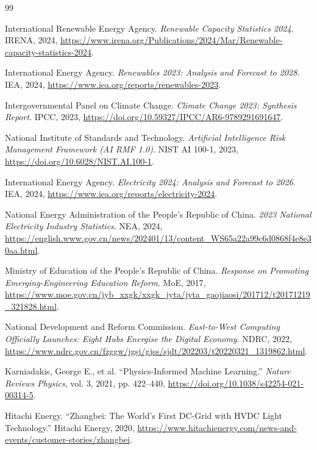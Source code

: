 \documentclass[12pt]{article}
\begin{document}
\begin{thebibliography}{99}

International Renewable Energy Agency. \textit{Renewable Capacity Statistics 2024}. IRENA, 2024, \url{https://www.irena.org/Publications/2024/Mar/Renewable-capacity-statistics-2024}.

International Energy Agency. \textit{Renewables 2023: Analysis and Forecast to 2028}. IEA, 2024, \url{https://www.iea.org/reports/renewables-2023}.

Intergovernmental Panel on Climate Change. \textit{Climate Change 2023: Synthesis Report}. IPCC, 2023, \url{https://doi.org/10.59327/IPCC/AR6-9789291691647}.

National Institute of Standards and Technology. \textit{Artificial Intelligence Risk Management Framework (AI RMF 1.0)}. NIST AI 100-1, 2023, \url{https://doi.org/10.6028/NIST.AI.100-1}.

International Energy Agency. \textit{Electricity 2024: Analysis and Forecast to 2026}. IEA, 2024, \url{https://www.iea.org/reports/electricity-2024}.

National Energy Administration of the People's Republic of China. \textit{2023 National Electricity Industry Statistics}. NEA, 2024, \url{https://english.www.gov.cn/news/202401/13/content_WS65a22a99c6d0868f4e8e30aa.html}.

Ministry of Education of the People's Republic of China. \textit{Response on Promoting Emerging-Engineering Education Reform}. MoE, 2017, \url{https://www.moe.gov.cn/jyb_xxgk/xxgk_jyta/jyta_gaojiaosi/201712/t20171219_321828.html}.

National Development and Reform Commission. \textit{East-to-West Computing Officially Launches: Eight Hubs Energise the Digital Economy}. NDRC, 2022, \url{https://www.ndrc.gov.cn/fzggw/jgsj/gjss/sjdt/202203/t20220321_1319862.html}.

Karniadakis, George E., et al. ``Physics-Informed Machine Learning.'' \textit{Nature Reviews Physics}, vol. 3, 2021, pp. 422--440, \url{https://doi.org/10.1038/s42254-021-00314-5}.

Hitachi Energy. ``Zhangbei: The World's First DC-Grid with HVDC Light Technology.'' Hitachi Energy, 2020, \url{https://www.hitachienergy.com/news-and-events/customer-stories/zhangbei}.

\end{thebibliography}
\end{document}

